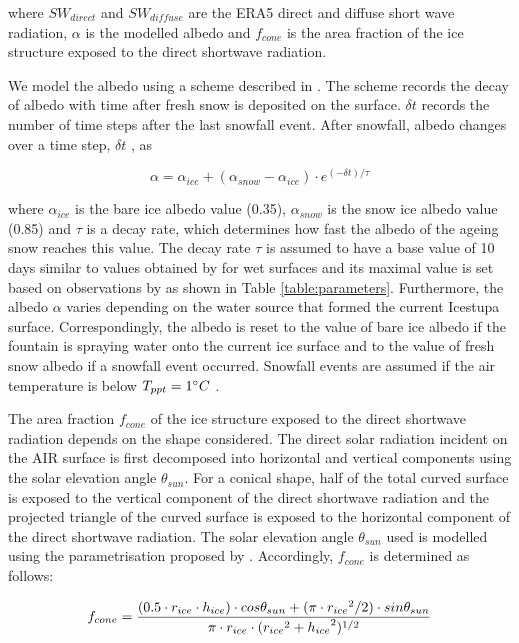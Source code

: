 \documentclass[utf8]{frontiersSCNS} %
\begin{document}
where $SW_{direct}$ and $SW_{diffuse}$ are the ERA5 direct and diffuse short wave radiation, $\alpha$ is the modelled
albedo and $f_{cone}$ is the area fraction of the ice structure exposed to the direct shortwave radiation.

We model the albedo using a scheme described in \cite{OerlemansKnap_1998}. The scheme records the decay of albedo with
time after fresh snow is deposited on the surface. $\delta t$ records the number of time steps after the last snowfall
event. After snowfall, albedo changes over a time step, $\delta t$ , as

\begin{equation} \alpha=\alpha_{ice}+(\alpha_{snow}-\alpha_{ice}) \cdot e^{(-\delta t)/\tau} \label{eqn:a}
\end{equation}

where $\alpha_{ice}$ is the bare ice albedo value (0.35), $\alpha_{snow}$ is the snow ice albedo value (0.85) and
$\tau$ is a decay rate, which determines how fast the albedo of the ageing snow reaches this value.  The decay rate
$\tau$ is assumed to have a base value of 10 days similar to values obtained by \cite{Schmidt_2017} for wet surfaces
and its maximal value is set based on observations by \cite{OerlemansKnap_1998} as shown in Table
\ref{table:parameters}.  Furthermore, the albedo $\alpha$ varies depending on the water source that formed the current
Icestupa surface.  Correspondingly, the albedo is reset to the value of bare ice albedo if the fountain is spraying
water onto the current ice surface and to the value of fresh snow albedo if a snowfall event occurred. Snowfall events
are assumed if the air temperature is below $T_{ppt}=1 \degree C$ \citep{FujitaAgeta_2000}.

The area fraction $f_{cone}$ of the ice structure exposed to the direct shortwave radiation depends on the shape
considered. The direct solar radiation incident on the AIR surface is first decomposed into horizontal and vertical
components using the solar elevation angle $\theta_{sun}$. For a conical shape, half of the total curved surface is
exposed to the vertical component of the direct shortwave radiation and the projected triangle of the curved surface is
exposed to the horizontal component of the direct shortwave radiation. The solar elevation angle $\theta_{sun}$ used is
modelled using the parametrisation proposed by \cite{Woolf_1968}. Accordingly, $f_{cone}$ is determined as follows:

\begin{equation} \begin{split} f_{cone}& =\frac{(0.5 \cdot r_{ice} \cdot h_{ice}) \cdot cos \theta_{sun} +(\pi \cdot
{r_{ice}}^2/2) \cdot sin \theta_{sun} }{\pi \cdot r_{ice} \cdot ({r_{ice}}^2+{h_{ice}}^2)^{1/2}}\\ \end{split}
\label{eqn:f_{cone}} \end{equation}
\end{document}

